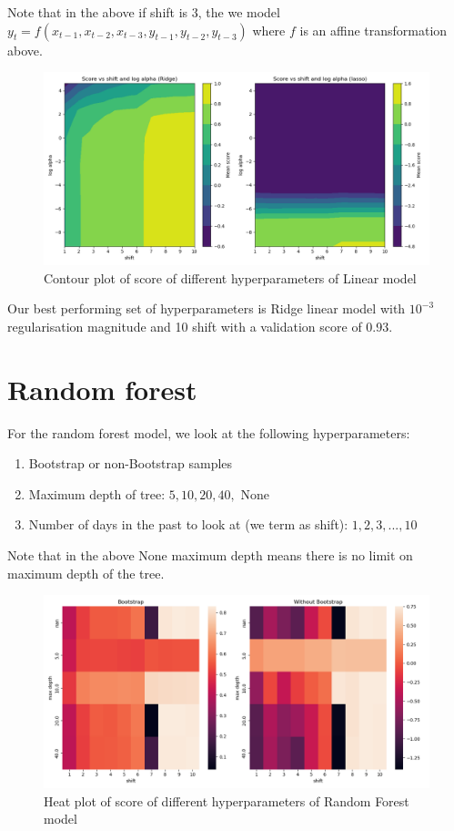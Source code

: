 \documentclass{article}
\begin{document}
Note that in the above if shift is $3$, the we model $y_t = f(x_{t-1},x_{t-2},x_{t-3}, y_{t-1},y_{t-2},y_{t-3})$ where $f$ is an affine transformation above. 

\begin{figure}
\centering
\includegraphics[width=1\linewidth]{lm_plot.png}
\caption{\label{fig:lm}Contour plot of score of different hyperparameters of Linear model}
\end{figure}

Our best performing set of hyperparameters is Ridge linear model with $10^{-3}$ regularisation magnitude and 10 shift with a validation score of 0.93.

\section{Random forest}

For the random forest model, we look at the following hyperparameters:

\begin{enumerate}
\item Bootstrap or non-Bootstrap samples
\item Maximum depth of tree: $5, 10, 20, 40,$ None
\item Number of days in the past to look at (we term as shift): $1, 2, 3, ..., 10$
\end{enumerate}

Note that in the above None maximum depth means there is no limit on maximum depth of the tree.

\begin{figure}
\centering
\includegraphics[width=1\linewidth]{rf_plot.png}
\caption{\label{fig:rf}Heat plot of score of different hyperparameters of Random Forest model}
\end{figure}
\end{document}

